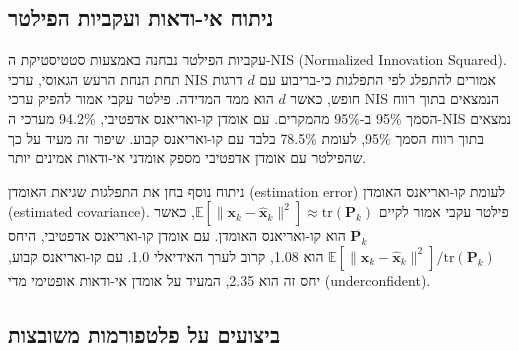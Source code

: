 \begin{table}[htbp]
\centering
\caption{תוצאות ניסוי ablation: תרומת הסונאר הקולי לביצועי NavigatorCrew. ATE RMSE [cm] על פני כל מערכי הנתונים.}
\label{tab:ch08_ablation}
\end{table}

\subsection{ניתוח אי-ודאות ועקביות הפילטר}
\label{sec:ch08_uncertainty}

עקביות הפילטר נבחנה באמצעות סטטיסטיקת ה-NIS (Normalized Innovation Squared). תחת הנחת הרעש הגאוסי, ערכי NIS אמורים להתפלג לפי התפלגות כי-בריבוע עם $d$ דרגות חופש, כאשר $d$ הוא ממד המדידה. פילטר עקבי אמור להפיק ערכי NIS הנמצאים בתוך רווח הסמך 95\% ב-95\% מהמקרים. עם אומדן קו-ואריאנס אדפטיבי, 94.2\% מערכי ה-NIS נמצאים בתוך רווח הסמך 95\%, לעומת 78.5\% בלבד עם קו-ואריאנס קבוע. שיפור זה מעיד על כך שהפילטר עם אומדן אדפטיבי מספק אומדני אי-ודאות אמינים יותר.

ניתוח נוסף בחן את התפלגות שגיאת האומדן (estimation error) לעומת קו-ואריאנס האומדן (estimated covariance). פילטר עקבי אמור לקיים $\mathbb{E}[\|\mathbf{x}_k - \hat{\mathbf{x}}_k\|^2] \approx \text{tr}(\mathbf{P}_k)$, כאשר $\mathbf{P}_k$ הוא קו-ואריאנס האומדן. עם אומדן קו-ואריאנס אדפטיבי, היחס $\mathbb{E}[\|\mathbf{x}_k - \hat{\mathbf{x}}_k\|^2] / \text{tr}(\mathbf{P}_k)$ הוא 1.08, קרוב לערך האידיאלי 1.0. עם קו-ואריאנס קבוע, יחס זה הוא 2.35, המעיד על אומדן אי-ודאות אופטימי מדי (underconfident).

\subsection{ביצועים על פלטפורמות משובצות}
\label{sec:ch08_embedded}

